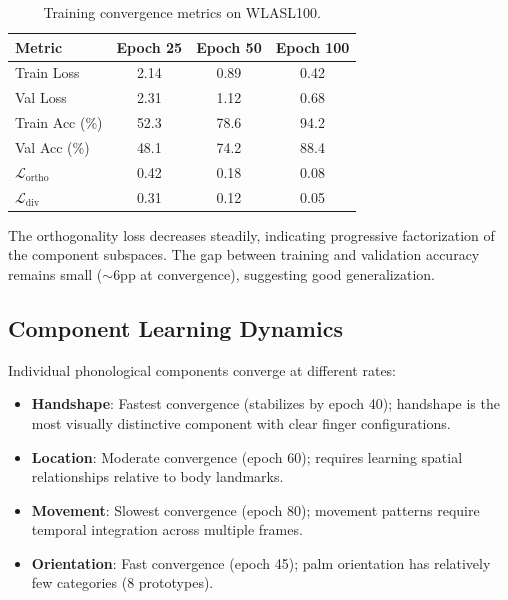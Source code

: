 \documentclass{article}
\theoremstyle{definition}
\theoremstyle{remark}
\begin{document}
\begin{table}[ht]
\caption{Training convergence metrics on WLASL100.}
\label{tab:convergence}
\vspace{-1mm}
\begin{center}
\begin{small}
\begin{tabular*}{\columnwidth}{@{\extracolsep{\fill}}lccc@{}}
\toprule
Metric & Epoch 25 & Epoch 50 & Epoch 100 \\
\midrule
Train Loss & 2.14 & 0.89 & 0.42 \\
Val Loss & 2.31 & 1.12 & 0.68 \\
Train Acc (\%) & 52.3 & 78.6 & 94.2 \\
Val Acc (\%) & 48.1 & 74.2 & 88.4 \\
$\mathcal{L}_{\text{ortho}}$ & 0.42 & 0.18 & 0.08 \\
$\mathcal{L}_{\text{div}}$ & 0.31 & 0.12 & 0.05 \\
\bottomrule
\end{tabular*}
\end{small}
\end{center}
\vspace{-2mm}
\end{table}

The orthogonality loss decreases steadily, indicating progressive factorization of the component subspaces. The gap between training and validation accuracy remains small ($\sim$6pp at convergence), suggesting good generalization.

\subsection{Component Learning Dynamics}

Individual phonological components converge at different rates:

\begin{itemize}[nosep,topsep=3pt,leftmargin=*]
\item \textbf{Handshape}: Fastest convergence (stabilizes by epoch 40); handshape is the most visually distinctive component with clear finger configurations.
\item \textbf{Location}: Moderate convergence (epoch 60); requires learning spatial relationships relative to body landmarks.
\item \textbf{Movement}: Slowest convergence (epoch 80); movement patterns require temporal integration across multiple frames.
\item \textbf{Orientation}: Fast convergence (epoch 45); palm orientation has relatively few categories (8 prototypes).
\end{itemize}
\end{document}
